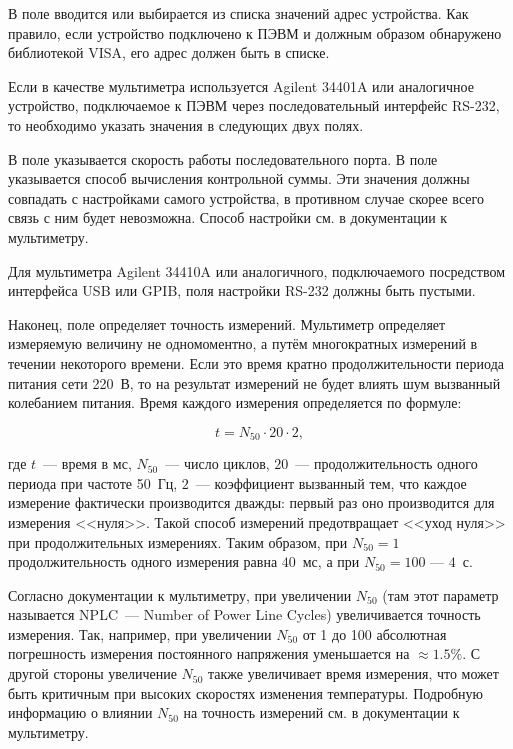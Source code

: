 В поле  вводится или выбирается из списка значений адрес устройства. Как правило, если устройство подключено к ПЭВМ и должным образом обнаружено библиотекой VISA, его адрес должен быть в списке.

\bigskip

Если в качестве мультиметра используется Agilent 34401A или аналогичное устройство, подключаемое к ПЭВМ через последовательный интерфейс RS-232, то необходимо указать значения в следующих двух полях.

В поле  указывается скорость работы последовательного порта. В поле  указывается способ вычисления контрольной суммы. Эти значения должны совпадать с настройками самого устройства, в противном случае скорее всего связь с ним будет невозможна. Способ настройки см. в документации к мультиметру.


Для мультиметра Agilent 34410A или аналогичного, подключаемого посредством интерфейса USB или GPIB, поля настройки RS-232 должны быть пустыми.

\bigskip

Наконец, поле  определяет точность измерений. Мультиметр определяет измеряемую величину не одномоментно, а путём многократных измерений в течении некоторого времени. Если это время кратно продолжительности периода питания сети 220~В, то на результат измерений не будет влиять шум вызванный колебанием питания. Время каждого измерения определяется по формуле:

\begin{equation}
t = N_{50} \cdot 20 \cdot 2,
\end{equation}

\noindent где $t$~--- время в мс, $N_{50}$~--- число циклов, $20$~--- продолжительность одного периода при частоте 50~Гц, $2$~--- коэффициент вызванный тем, что каждое измерение фактически производится дважды: первый раз оно производится для измерения <<нуля>>. Такой способ измерений предотвращает <<уход нуля>> при продолжительных измерениях. Таким образом, при $N_{50} = 1$ продолжительность одного измерения равна $40$~мс, а при $N_{50} = 100$ --- $4$~с.

Согласно документации к мультиметру, при увеличении $N_{50}$ (там этот параметр называется NPLC~--- Number of Power Line Cycles) увеличивается точность измерения. Так, например, при увеличении $N_{50}$ от 1 до 100 абсолютная погрешность измерения постоянного напряжения уменьшается на $\approx 1.5\%$. С другой стороны увеличение $N_{50}$ также увеличивает время измерения, что может быть критичным при высоких скоростях изменения температуры. Подробную информацию о влиянии $N_{50}$ на точность измерений см. в документации к мультиметру.

